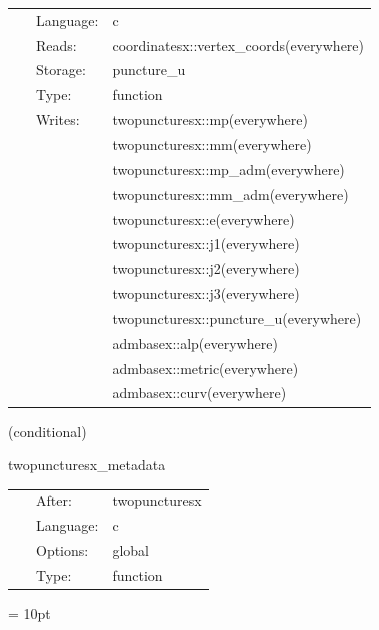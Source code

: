  \begin{tabular*}{160mm}{cll} 
~ & Language:  & c \\ 
~ & Reads:  & coordinatesx::vertex\_coords(everywhere) \\ 
~ & Storage:  & puncture\_u \\ 
~ & Type:  & function \\ 
~ & Writes:  & twopuncturesx::mp(everywhere) \\ 
~& ~ &twopuncturesx::mm(everywhere)\\ 
~& ~ &twopuncturesx::mp\_adm(everywhere)\\ 
~& ~ &twopuncturesx::mm\_adm(everywhere)\\ 
~& ~ &twopuncturesx::e(everywhere)\\ 
~& ~ &twopuncturesx::j1(everywhere)\\ 
~& ~ &twopuncturesx::j2(everywhere)\\ 
~& ~ &twopuncturesx::j3(everywhere)\\ 
~& ~ &twopuncturesx::puncture\_u(everywhere)\\ 
~& ~ &admbasex::alp(everywhere)\\ 
~& ~ &admbasex::metric(everywhere)\\ 
~& ~ &admbasex::curv(everywhere)\\ 
\end{tabular*} 


\vspace{5mm}

   (conditional) 

\hspace{5mm} twopuncturesx\_metadata 

\hspace{5mm}{\it output twopuncturesx metadata } 


\hspace{5mm}

 \begin{tabular*}{160mm}{cll} 
~ & After:  & twopuncturesx \\ 
~ & Language:  & c \\ 
~ & Options:  & global \\ 
~ & Type:  & function \\ 
\end{tabular*} 



\vspace{5mm}\parskip = 10pt 
